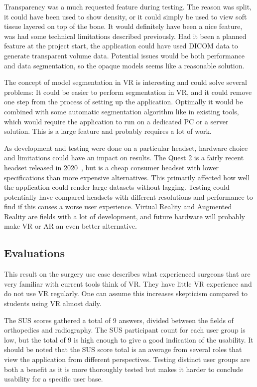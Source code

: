 \documentclass[a4paper]{report}
\begin{document}
Transparency was a much requested feature during testing. The reason was split, it could have been used to show density, or it could simply be used to view soft tissue layered on top of the bone. It would definitely have been a nice feature, was had some technical limitations described previously. Had it been a planned feature at the project start, the application could have used DICOM data to generate transparent volume data. Potential issues would be both performance and data segmentation, so the opaque models seems like a reasonable solution.

The concept of model segmentation in VR is interesting and could solve several problems: It could be easier to perform segmentation in VR, and it could remove one step from the process of setting up the application.
Optimally it would be combined with some automatic segmentation algorithm like in existing tools, which would require the application to run on a dedicated PC or a server solution.
This is a large feature and probably requires a lot of work.

As development and testing were done on a particular headset, hardware choice and limitations could have an impact on results. The Quest 2 is a fairly recent headset released in 2020~\cite{noauthor_oculus_nodate}, but is a cheap consumer headset with lower specifications than more expensive alternatives. This primarily affected how well the application could render large datasets without lagging.
Testing could potentially have compared headsets with different resolutions and performance to find if this causes a worse user experience.
Virtual Reality and Augmented Reality are fields with a lot of development, and future hardware will probably make VR or AR an even better alternative.

\subsection{Evaluations} %
This result on the surgery use case describes what experienced surgeons that are very familiar with current tools think of VR. They have little VR experience and do not use VR regularly. One can assume this increases skepticism compared to students using VR almost daily.

The SUS scores gathered a total of 9 answers, divided between the fields of orthopedics and radiography.
The SUS participant count for each user group is low, but the total of 9 is high enough to give a good indication of the usability. It should be noted that the SUS score total is an average from several roles that view the application from different perspectives. Testing distinct user groups are both a benefit as it is more thoroughly tested but makes it harder to conclude usability for a specific user base.
\end{document}
